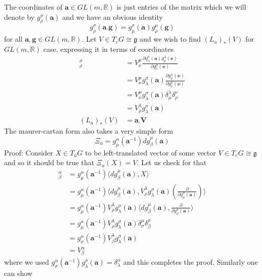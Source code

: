 \documentclass[12pt]{article}
\newcommand{\matr}[1]{\mathbf{#1}}
\begin{document}
The coordinates of $\matr{a} \in GL(m, \mathbb{R})$ is just entries of the matrix which we will denote by $g^{\sigma}_{\rho}(\matr{a})$ and we have an obvious identity
\[
g^{\sigma}_{\rho}(\matr{a}.\matr{g}) = g^{\sigma}_{\mu}(\matr{a})g^{\mu}_{\rho}(\matr{g})
\] for all $\matr{a}, \matr{g} \in GL(m, \mathbb{R})$. Let $V \in T_{e}G \cong \mathfrak{g}$ and we wish to find $(L_{a})_{\ast}(V)$ for $GL(m, \mathbb{R})$ case, expressing it in terms of coordinates
\begin{align*}
    [(L_{a})_{\ast}(V)]^{\sigma}_{\rho} &= V^{\mu}_{\nu}\frac{\partial g^{\sigma}_{\lambda}(\matr{a})g^{\lambda}_{\rho}(\matr{e})}{\partial g^{\mu}_{\nu}(\matr{e})} \\
                                        &= V^{\mu}_{\nu}g^{\sigma}_{\lambda}(\matr{a})\frac{\partial g^{\lambda}_{\rho}(\matr{e})}{\partial g^{\mu}_{\nu}(\matr{e})} \\
                                        &= V^{\mu}_{\nu}g^{\sigma}_{\lambda}(\matr{a})\delta^{\lambda}_{\mu}\delta^{\nu}_{\rho} \\
                                        &= V^{\lambda}_{\rho}g^{\sigma}_{\lambda}(\matr{a}) \\
                      (L_{a})_{\ast}(V) &= \matr{a}.\matr{V}
\end{align*}The maurer-cartan form also takes a very simple form
\[
\Xi_{a} = g^{\alpha}_{\mu}(\matr{a}^{-1})dg^{\mu}_{\beta}(\matr{a})
\]
Proof:
Consider $X \in T_{a}G$ to be left-translated vector of some vector $V \in T_{e}G \cong \mathfrak{g}$ and so it should be true that $\Xi_{a}(X) = V$. Let us check for that
\begin{align*}
    [\Xi_{a}(X)]^{\alpha}_{\beta} &= g^{\alpha}_{\mu}(\matr{a}^{-1})\langle dg^{\mu}_{\beta}(\matr{a}), X\rangle \\
               &= g^{\alpha}_{\mu}(\matr{a}^{-1})\langle dg^{\mu}_{\beta}(\matr{a}), V^{\lambda}_{\rho}g^{\sigma}_{\lambda}(\matr{a})(\frac{\partial}{\partial g^{\sigma}_{\rho}(\matr{a})})\rangle \\
               &= g^{\alpha}_{\mu}(\matr{a}^{-1})V^{\lambda}_{\rho}g^{\sigma}_{\lambda}(\matr{a})\langle dg^{\mu}_{\beta}(\matr{a}),\frac{\partial}{\partial g^{\sigma}_{\rho}(\matr{a})}\rangle \\
               &= g^{\alpha}_{\mu}(\matr{a}^{-1})V^{\lambda}_{\rho}g^{\sigma}_{\lambda}(\matr{a})\delta^{\mu}_{\sigma}\delta^{\rho}_{\beta} \\
               &= g^{\alpha}_{\sigma}(\matr{a}^{-1})V^{\lambda}_{\beta}g^{\sigma}_{\lambda}(\matr{a}) \\
               &= V^{\alpha}_{\beta}
\end{align*} where we used $g^{\alpha}_{\sigma}(\matr{a}^{-1})g^{\sigma}_{\lambda}(\matr{a}) = \delta^{\alpha}_{\lambda}$ and this completes the proof. Similarly one can show
\end{document}
